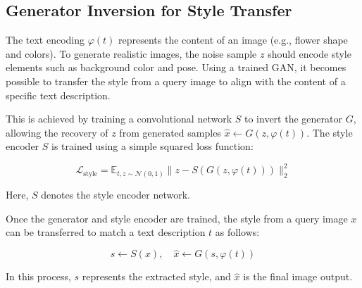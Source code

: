 \subsection*{Generator Inversion for Style Transfer}

The text encoding \(\varphi(t)\) represents the content of an image 
(e.g., flower shape and colors). 
To generate realistic images, the noise sample \(z\) should encode 
style elements such as background color and pose. 
Using a trained GAN, it becomes possible to transfer the style from 
a query image to align with the content of a specific text description.

This is achieved by training a convolutional network \(S\) to invert 
the generator \(G\), allowing the recovery of \(z\) 
from generated samples \(\hat{x} \leftarrow G(z, \varphi(t))\). 
The style encoder \(S\) is trained using a simple squared loss function:

\[
\mathcal{L}_{\text{style}} = \mathbb{E}_{t, z \sim \mathcal{N}(0, 1)} \| z - S(G(z, \varphi(t))) \|_2^2 \tag{6}
\]

Here, \(S\) denotes the style encoder network.

Once the generator and style encoder are trained, 
the style from a query image \(x\) can be transferred to match a text 
description \(t\) as follows:

\[
s \leftarrow S(x), \quad \hat{x} \leftarrow G(s, \varphi(t))
\]

In this process, \(s\) represents the extracted style, and \(\hat{x}\) 
is the final image output.

